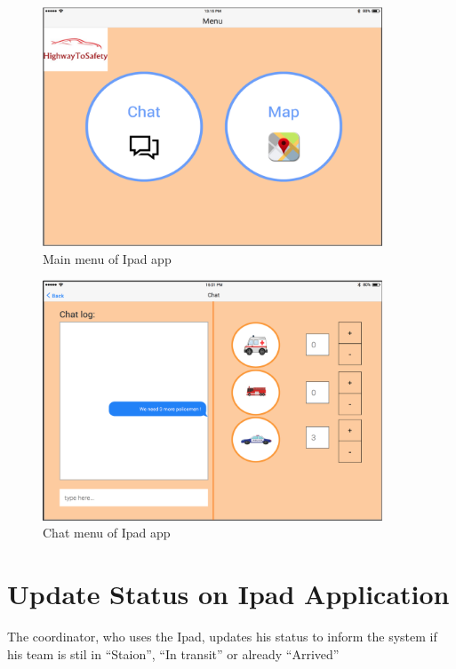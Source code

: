 \begin{minipage}{1.0\textwidth}
\begin{figure}[H]
\caption{Main menu of Ipad app}
\includegraphics[width=0.9\textwidth]{IpadAppHome1.eps}
\end{figure}
\end{minipage}

\begin{minipage}{1.0\textwidth}
\begin{figure}[H]
\caption{Chat menu of Ipad app}
\includegraphics[width=0.9\textwidth]{Chat_Example.eps}
\end{figure}
\end{minipage}

\section{Update Status on Ipad Application}
\label{operation:MyOperation}
The coordinator, who uses the Ipad, updates his status to inform the system if
his team is stil in “Staion”, “In transit” or already “Arrived”

